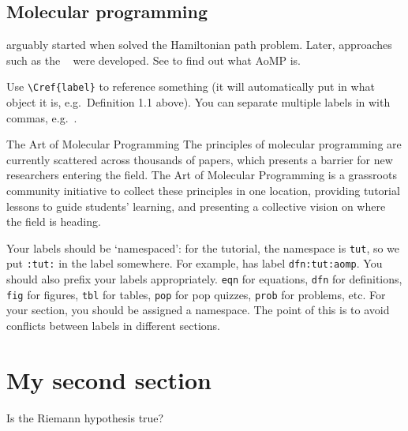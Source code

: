 \subsection{Molecular programming}

 arguably started when \textcite{adleman-hampath} solved the Hamiltonian path problem.
Later, approaches such as the ~\cite{winfree-tam} were developed.
See  to find out what AoMP is.

Use \verb|\Cref{label}| to reference something (it will automatically put in what object it is, e.g.\ Definition 1.1 above).
You can separate multiple labels in with commas, e.g.\ .

\begin{definition}[label=dfn:tut:aomp]{The Art of Molecular Programming}
The principles of molecular programming are currently scattered across thousands of papers, which presents a barrier for new researchers entering the field.
The Art of Molecular Programming is a grassroots community initiative to collect these principles in one location, providing tutorial lessons to guide students' learning, and presenting a collective vision on where the field is heading.
\end{definition}

Your labels should be `namespaced': for the tutorial, the namespace is \verb|tut|, so we put \verb|:tut:| in the label somewhere.
For example,  has label \verb|dfn:tut:aomp|.
You should also prefix your labels appropriately.
\verb|eqn| for equations, \verb|dfn| for definitions, \verb|fig| for figures, \verb|tbl| for tables, \verb|pop| for pop quizzes, \verb|prob| for problems, etc.
For your section, you should be assigned a namespace.
The point of this is to avoid conflicts between labels in different sections.

\section{My second section}

\begin{popquiz}[label=pop:tut:riemann,no solution,DANGER]
  Is the Riemann hypothesis true?
\end{popquiz}

